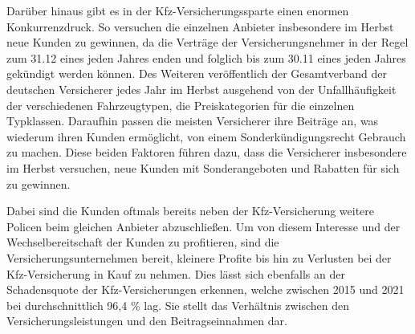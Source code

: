 Darüber hinaus gibt es in der Kfz-Versicherungssparte einen enormen Konkurrenzdruck. So versuchen die einzelnen Anbieter insbesondere im Herbst neue Kunden zu gewinnen, da die Verträge der Versicherungsnehmer in der Regel zum 31.12 eines jeden Jahres enden und folglich bis zum 30.11 eines jeden Jahres gekündigt werden können.\autocite[Vgl.][]{WARENTEST2022} Des Weiteren veröffentlich der Gesamtverband der deutschen Versicherer jedes Jahr im Herbst ausgehend von der Unfallhäufigkeit der verschiedenen Fahrzeugtypen, die Preiskategorien für die einzelnen Typklassen. Daraufhin passen die meisten Versicherer ihre Beiträge an, was wiederum ihren Kunden ermöglicht, von einem Sonderkündigungsrecht Gebrauch zu machen.\autocite[Vgl.][]{NUS2022} Diese beiden Faktoren führen dazu, dass die Versicherer insbesondere im Herbst versuchen, neue Kunden mit Sonderangeboten und Rabatten für sich zu gewinnen. 

Dabei sind die Kunden oftmals bereits neben der Kfz-Versicherung weitere Policen beim gleichen Anbieter abzuschließen. Um von diesem Interesse und der Wechselbereitschaft der Kunden zu profitieren, sind die Versicherungsunternehmen bereit, kleinere Profite bis hin zu Verlusten bei der Kfz-Versicherung in Kauf zu nehmen.\autocite[Vgl.][]{HARTUNG2019} Dies lässt sich ebenfalls an der Schadensquote der Kfz-Versicherungen erkennen, welche zwischen 2015 und 2021 bei durchschnittlich 96,4 \% lag. Sie stellt das Verhältnis zwischen den Versicherungsleistungen und den Beitragseinnahmen dar.\autocite[Vgl.][]{GDVKFZ}  



\newpage

